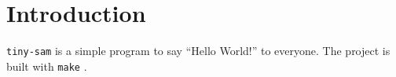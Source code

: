 \documentclass{article}
\begin{document}
\section{Introduction}
\texttt{tiny-sam} is a simple program to say ``Hello World!'' to everyone.
The project is built with \texttt{make} \citep{Mecklenburg:2004aa}.
\printbibliography
\end{document}
